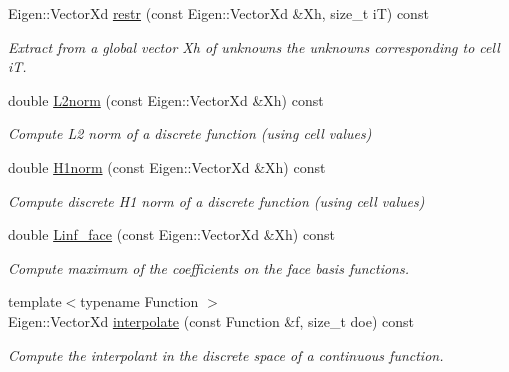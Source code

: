 \begin{DoxyCompactItemize}
Eigen\+::\+Vector\+Xd \hyperlink{classHArDCore3D_1_1HybridCore_a02b46a742045262030431b73eb112f9c}{restr} (const Eigen\+::\+Vector\+Xd \&Xh, size\+\_\+t iT) const
\begin{DoxyCompactList}\small\item\em Extract from a global vector Xh of unknowns the unknowns corresponding to cell iT. \end{DoxyCompactList}\item 
\mbox{\label{classHArDCore3D_1_1HybridCore_a6c2a3d4fde899dde50fda5d97eafdc07}} 
double \hyperlink{classHArDCore3D_1_1HybridCore_a6c2a3d4fde899dde50fda5d97eafdc07}{L2norm} (const Eigen\+::\+Vector\+Xd \&Xh) const
\begin{DoxyCompactList}\small\item\em Compute L2 norm of a discrete function (using cell values) \end{DoxyCompactList}\item 
\mbox{\label{classHArDCore3D_1_1HybridCore_a5962007697ffc13367070f7c4bcbe875}} 
double \hyperlink{classHArDCore3D_1_1HybridCore_a5962007697ffc13367070f7c4bcbe875}{H1norm} (const Eigen\+::\+Vector\+Xd \&Xh) const
\begin{DoxyCompactList}\small\item\em Compute discrete H1 norm of a discrete function (using cell values) \end{DoxyCompactList}\item 
\mbox{\label{classHArDCore3D_1_1HybridCore_a333758d69cc0cea9df7bd54042551504}} 
double \hyperlink{classHArDCore3D_1_1HybridCore_a333758d69cc0cea9df7bd54042551504}{Linf\+\_\+face} (const Eigen\+::\+Vector\+Xd \&Xh) const
\begin{DoxyCompactList}\small\item\em Compute maximum of the coefficients on the face basis functions. \end{DoxyCompactList}\item 
{\footnotesize template$<$typename Function $>$ }\\Eigen\+::\+Vector\+Xd \hyperlink{group__HybridCore_gaa1c3baf0764f3f160759e0ffc8969dfb}{interpolate} (const Function \&f, size\+\_\+t doe) const
\begin{DoxyCompactList}\small\item\em Compute the interpolant in the discrete space of a continuous function. \end{DoxyCompactList}\item 

\end{DoxyCompactItemize}
